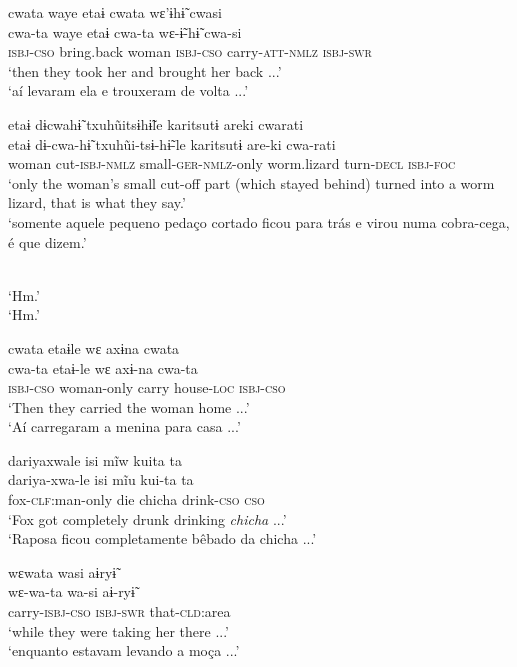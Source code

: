 \documentclass[output=paper,
modfonts,nonflat
]{langsci/langscibook}
\begin{document}
  
\ea cwata waye etaɨ cwata wɛ'ɨhɨ̃ cwasi\\[.3em]
\gll cwa-ta		waye			etaɨ		cwa-ta		wɛ-ɨ̃-hɨ̃			cwa-si\\
\textsc{isbj-cso}		bring.back		woman	\textsc{isbj-cso}		carry-\textsc{att-nmlz}	\textsc{isbj-swr}\\
\glt ‘then they took her and brought her back ...’\\
‘aí levaram ela e trouxeram de volta ...'
\z

\ea etaɨ dɨcwahɨ̃ txuhũitsɨhɨ̃le karitsutɨ areki cwarati\\[.3em]
\gll etaɨ		dɨ-cwa-hɨ̃		txuhũi-tsɨ-hɨ̃-le			karitsutɨ		are-ki		cwa-rati{\footnotemark}\\
woman	cut-\textsc{isbj-nmlz}	small-\textsc{ger-nmlz}-only		worm.lizard	turn-\textsc{decl}	\textsc{isbj-foc}\\
\glt ‘only the woman’s small cut-off part (which stayed behind) turned into a worm lizard, that is what they say.’\\
‘somente aquele pequeno pedaço cortado ficou para trás e virou numa cobra-cega, é que dizem.'
\z

\\[.3em]
 ‘Hm.'\\
 ‘Hm.'
\z

\ea cwata etaɨle wɛ axɨna cwata\\[.3em]
\gll cwa-ta		etaɨ-le			wɛ		axɨ-na			cwa-ta\\
\textsc{isbj-cso}		woman-only	carry	house-\textsc{loc}	\textsc{isbj-cso}\\
\glt ‘Then they carried the woman home ...’\\
‘Aí carregaram a menina para casa ...'
\z
 
\ea dariyaxwale isi mĩw kuita ta\\[.3em]
\gll dariya-xwa-le		isi	mĩu	kui-ta		ta\\
fox-\textsc{clf}:man-only	die	chicha	drink-\textsc{cso}	\textsc{cso}\\
\glt ‘Fox got completely drunk drinking \textit{chicha} ...’\\
‘Raposa ficou completamente bêbado da chicha ...'
\z

\ea wɛwata wasi aɨryɨ̃\\[.3em]
\gll wɛ-wa-ta		wa-si		aɨ-ryɨ̃\\
carry-\textsc{isbj-cso}	\textsc{isbj-swr}		that-\textsc{cld}:area\\
\glt ‘while they were taking her there ...’\\
‘enquanto estavam levando a moça ...'
\z
\end{document}
